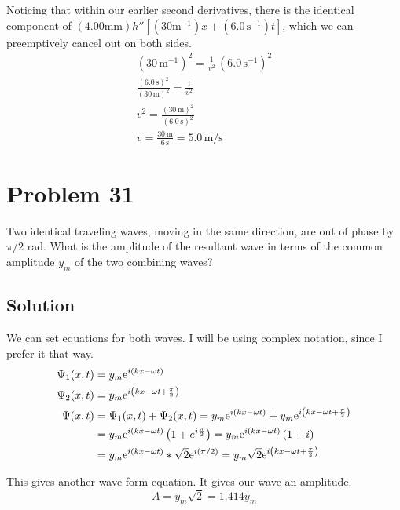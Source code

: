 \documentclass[12pt]{article}
\newcommand{\e}[1]{{\rm e}^{i\left( #1 \right)}}
\begin{document}
            Noticing that within our earlier second derivatives, there is the identical component of $(4.00 \unit{\milli\meter}) h''[(30 \unit{\meter^{-1}})x + (6.0\,\unit{\second^{-1}})t]$, which we can preemptively cancel out on both sides.
            \begin{gather}
                (30\,\unit{\meter^{-1}})^2  =   \frac{1}{v^2}\,(6.0\,\unit{\second^{-1}})^2\\
                \frac{(6.0\,\unit{\second})^2}{(30\,\unit{\meter})^2}   =   \frac{1}{v^2}\\
                v^2 =   \frac{(30\,\unit{\meter})^2}{(6.0\,\unit{\second})^2}\\
                v   =   \frac{30\,\unit{\meter}}{6\,\unit{\second}}
                    =   \boxed{5.0\,\unit{\meter/\second}}
            \end{gather}

    \pagebreak
    \section{Problem 31}
        Two identical traveling waves, moving in the same direction, are out of phase by $\pi/2$ rad. 
        What is the amplitude of the resultant wave in terms of the common amplitude $y_m$ of the two combining waves?

        \subsection{Solution}
        We can set equations for both waves.
        I will be using complex notation, since I prefer it that way.
        \begin{align}
            \Psi_1(x,t) &=  y_m \e{kx - \omega t}\\
            \Psi_2(x,t) &=  y_m \e{kx - \omega t + \frac{\pi}{2}}\\
            \Psi(x,t)   &=  \Psi_1(x,t) + \Psi_2(x,t)
                =   y_m \e{kx - \omega t} + y_m \e{kx - \omega t + \frac{\pi}{2}}\\
                &=  y_m \e{kx - \omega t}\left( 1 + e^{i\frac{\pi}{2}} \right)
                =   y_m \e{kx - \omega t}\left( 1 + i \right)\\
                &=  y_m \e{kx - \omega t} * \sqrt{2}\e{\pi/2}
                =   y_m \sqrt{2} \e{kx - \omega t + \frac{\pi}{2}}
        \end{align}

        This gives another wave form equation. 
        It gives our wave an amplitude. 
        \begin{equation}
            A   =   y_m \sqrt{2}
                =   \boxed{1.414 y_m}
        \end{equation}
\end{document}
